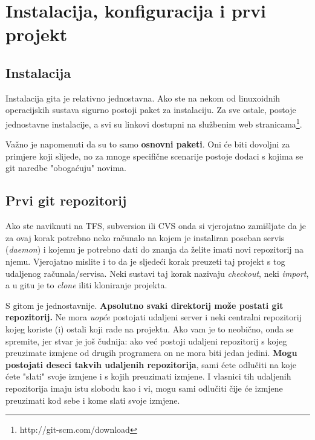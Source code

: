 \chapter*{Instalacija, konfiguracija i prvi projekt}

\section*{Instalacija}

Instalacija gita je relativno jednostavna. Ako ste na nekom od linuxoidnih operacijskih sustava sigurno postoji paket za instalaciju. 
Za sve ostale, postoje jednostavne instalacije, a svi su linkovi dostupni na službenim web stranicama\footnote{http://git-scm.com/download}.

Važno je napomenuti da su to samo \textbf{osnovni paketi}. 
Oni će biti dovoljni za primjere koji slijede, no za mnoge specifične scenarije postoje dodaci s kojima se git naredbe "obogaćuju" novima.

\section*{Prvi git repozitorij}

Ako ste naviknuti na TFS, subversion ili CVS onda si vjerojatno zamišljate da je za ovaj korak potrebno neko računalo na kojem je instaliran poseban servis (\emph{daemon}) i kojemu je potrebno dati do znanja da želite imati novi repozitorij na njemu.
Vjerojatno mislite i to da je sljedeći korak preuzeti taj projekt s tog udaljenog računala/servisa.
Neki sustavi taj korak nazivaju \emph{checkout}, neki \emph{import}, a u gitu je to \emph{clone} iliti kloniranje projekta.

S gitom je jednostavnije. 
\textbf{Apsolutno svaki direktorij može postati git repozitorij.}
Ne mora \emph{uopće} postojati udaljeni server i neki centralni repozitorij kojeg koriste (i) ostali koji rade na projektu.
Ako vam je to neobično, onda se spremite, jer stvar je još čudnija: ako već postoji udaljeni repozitorij s kojeg preuzimate izmjene od drugih programera on ne mora biti jedan jedini.
\textbf{Mogu postojati deseci takvih udaljenih repozitorija}, sami ćete odlučiti na koje ćete "slati" svoje izmjene i s kojih preuzimati izmjene.
I vlasnici tih udaljenih repozitorija imaju istu slobodu kao i vi, mogu sami odlučiti čije će izmjene preuzimati kod sebe i kome slati svoje izmjene.

